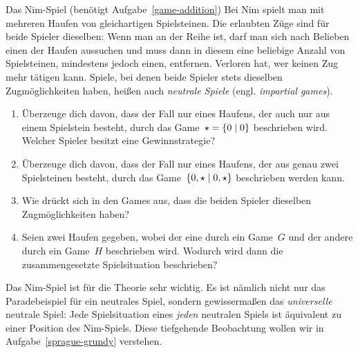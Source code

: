 \documentclass{zirkelblatt}
\begin{document}
\begin{aufgabe}{Das Nim-Spiel (benötigt Aufgabe~\ref{game-addition})}
\label{nim}
Bei Nim spielt man mit mehreren Haufen von gleichartigen Spielsteinen. Die
erlaubten Züge sind für beide Spieler dieselben: Wenn man an der Reihe ist,
darf man sich nach Belieben einen der Haufen aussuchen und muss dann in diesem eine
beliebige Anzahl von Spielsteinen, mindestens jedoch einen, entfernen. Verloren
hat, wer keinen Zug mehr tätigen kann. Spiele, bei denen beide Spieler stets
dieselben Zugmöglichkeiten haben, heißen auch \emph{neutrale Spiele} (engl.
\emph{impartial games}).
\begin{enumerate}
\item Überzeuge dich davon, dass der Fall nur eines Haufens, der auch nur aus
einem Spielstein besteht, durch das Game~$\star = \{ 0 \mathrel{|} 0 \}$ beschrieben wird.
Welcher Spieler besitzt eine Gewinnstrategie?
\item Überzeuge dich davon, dass der Fall nur eines Haufens, der aus genau zwei
Spielsteinen besteht, durch das Game~$\{ 0,\star \mathrel{|} 0,\star \}$ beschrieben
werden kann.
\item Wie drückt sich in den Games aus, dass die beiden Spieler dieselben
Zugmöglichkeiten haben?
\item Seien zwei Haufen gegeben, wobei der eine durch ein Game~$G$ und der
andere durch ein Game~$H$ beschrieben wird. Wodurch wird dann die
zusammengesetzte Spielsituation beschrieben?
\end{enumerate}
Das Nim-Spiel ist für die Theorie sehr wichtig. Es ist nämlich nicht nur das
Paradebeispiel für ein neutrales Spiel, sondern gewissermaßen das
\emph{universelle} neutrale Spiel: Jede Spielsituation eines \emph{jeden}
neutralen Spiels ist äquivalent zu einer Position des Nim-Spiels. Diese
tiefgehende Beobachtung wollen wir in Aufgabe~\ref{sprague-grundy} verstehen.
\end{aufgabe}
\end{document}
